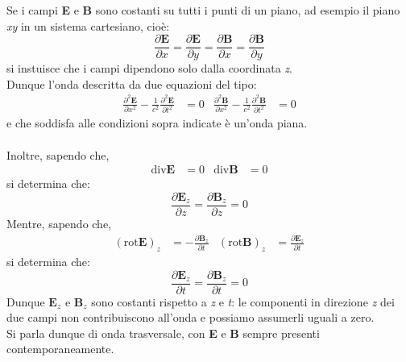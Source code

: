 \documentclass{article}
\begin{document}
Se i campi \textbf{E} e \textbf{B} sono costanti su tutti i punti di un piano, ad esempio il piano \emph{xy} in un sistema cartesiano, cioè:
\begin{equation}
    \frac{\partial\textbf{E}}{\partial x}=\frac{\partial\textbf{E}}{\partial y}=\frac{\partial\textbf{B}}{\partial x}=\frac{\partial\textbf{B}}{\partial y}
    \nonumber
\end{equation}
si instuisce che i campi dipendono solo dalla coordinata \emph{z}.\\
Dunque l’onda descritta da due equazioni del tipo:
\begin{align*}
    \frac{\partial^2\textbf{E}}{\partial x^2}-\frac{1}{c^2}\frac{\partial^2\textbf{E}}{\partial t^2}&=0 & \frac{\partial^2\textbf{B}}{\partial x^2}-\frac{1}{c^2}\frac{\partial^2\textbf{B}}{\partial t^2}&=0
    \nonumber
\end{align*}
e che soddisfa alle condizioni sopra indicate è un’onda piana.\\\\
Inoltre, sapendo che,  
\begin{align*}
\text{div}\textbf{E}&=0 & \text{div}\textbf{B}&=0
\nonumber
\end{align*}
si determina che:
\begin{equation}
  \frac{\partial\textbf{E}_z}{\partial z}=\frac{\partial\textbf{B}_z}{\partial z}=0
\nonumber
\end{equation}
Mentre, sapendo che,  
\begin{align*}
\left(\text{rot}\textbf{E}\right)_z&=-\frac{\partial\textbf{B}_z}{\partial t} & \left(\text{rot}\textbf{B}\right)_z&=\frac{\partial\textbf{E}_z}{\partial t}
\nonumber
\end{align*}
si determina che:
\begin{equation}
\frac{\partial\textbf{E}_z}{\partial t}=\frac{\partial\textbf{B}_z}{\partial t}=0
\nonumber
\end{equation}
Dunque $\textbf{E}_z $ e $\textbf{B}_z $ sono costanti rispetto a \emph{z} e \emph{t}: le componenti in direzione \emph{z} dei due campi non contribuiscono all'onda e possiamo assumerli uguali a zero. \\
Si parla dunque di onda trasversale, con \textbf{E} e \textbf{B} sempre presenti contemporaneamente.
\end{document}
